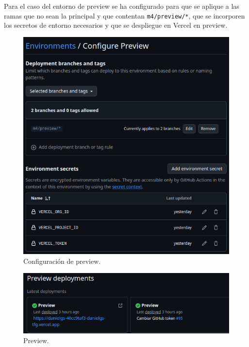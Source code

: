 Para el caso del entorno de preview se ha configurado para que se aplique a las ramas que no sean la principal y que contentan \texttt{m4/preview/*}, que se incorporen los secretos de entorno necesarios y que se despliegue en Vercel en preview.

\begin{figure}[H]
    \caption{Configuración de preview.}
    \centering
    \vspace*{0.5cm}
    \includegraphics[scale=0.35]{figuras/entorno_prev.png}
\end{figure}

\begin{figure}[H]
    \caption{Preview.}
    \centering
    \vspace*{0.5cm}
    \includegraphics[scale=0.35]{figuras/despliegue_prev.png}
\end{figure}

